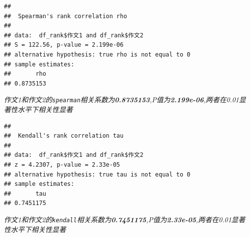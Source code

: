 \documentclass[
]{article}
\newenvironment{Shaded}{\begin{snugshade}}{\end{snugshade}}
\newcommand{\AttributeTok}[1]{\textcolor[rgb]{0.13,0.29,0.53}{#1}}
\newcommand{\CommentTok}[1]{\textcolor[rgb]{0.56,0.35,0.01}{\textit{#1}}}
\newcommand{\FunctionTok}[1]{\textcolor[rgb]{0.13,0.29,0.53}{\textbf{#1}}}
\newcommand{\NormalTok}[1]{#1}
\newcommand{\OtherTok}[1]{\textcolor[rgb]{0.56,0.35,0.01}{#1}}
\newcommand{\SpecialCharTok}[1]{\textcolor[rgb]{0.81,0.36,0.00}{\textbf{#1}}}
\newcommand{\StringTok}[1]{\textcolor[rgb]{0.31,0.60,0.02}{#1}}
\begin{document}
\begin{Shaded}
\end{Shaded}

\begin{verbatim}
## 
##  Spearman's rank correlation rho
## 
## data:  df_rank$作文1 and df_rank$作文2
## S = 122.56, p-value = 2.199e-06
## alternative hypothesis: true rho is not equal to 0
## sample estimates:
##       rho 
## 0.8735153
\end{verbatim}

\emph{作文1和作文2的\texttt{spearman}相关系数为\textbf{0.8735153},P值为\textbf{2.199e-06},两者在0.01显著性水平下相关性显著}

\begin{Shaded}
\end{Shaded}

\begin{verbatim}
## 
##  Kendall's rank correlation tau
## 
## data:  df_rank$作文1 and df_rank$作文2
## z = 4.2307, p-value = 2.33e-05
## alternative hypothesis: true tau is not equal to 0
## sample estimates:
##       tau 
## 0.7451175
\end{verbatim}

\emph{作文1和作文2的\texttt{kendall}相关系数为\textbf{0.7451175},P值为\textbf{2.33e-05},两者在0.01显著性水平下相关性显著}
\end{document}
